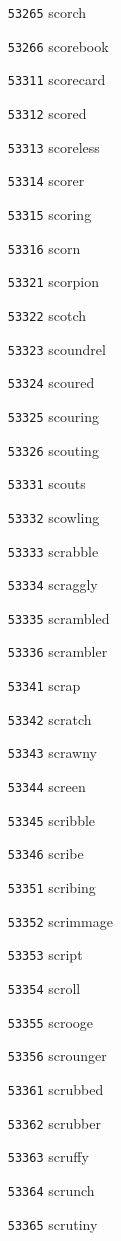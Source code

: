 \documentclass[twoside,11pt]{article}
\begin{document}
\begin{multicols}{5}
\begin{enumerate}
\item[\texttt{53265}] scorch
\item[\texttt{53266}] scorebook
\item[\texttt{53311}] scorecard
\item[\texttt{53312}] scored
\item[\texttt{53313}] scoreless
\item[\texttt{53314}] scorer
\item[\texttt{53315}] scoring
\item[\texttt{53316}] scorn
\item[\texttt{53321}] scorpion
\item[\texttt{53322}] scotch
\item[\texttt{53323}] scoundrel
\item[\texttt{53324}] scoured
\item[\texttt{53325}] scouring
\item[\texttt{53326}] scouting
\item[\texttt{53331}] scouts
\item[\texttt{53332}] scowling
\item[\texttt{53333}] scrabble
\item[\texttt{53334}] scraggly
\item[\texttt{53335}] scrambled
\item[\texttt{53336}] scrambler
\item[\texttt{53341}] scrap
\item[\texttt{53342}] scratch
\item[\texttt{53343}] scrawny
\item[\texttt{53344}] screen
\item[\texttt{53345}] scribble
\item[\texttt{53346}] scribe
\item[\texttt{53351}] scribing
\item[\texttt{53352}] scrimmage
\item[\texttt{53353}] script
\item[\texttt{53354}] scroll
\item[\texttt{53355}] scrooge
\item[\texttt{53356}] scrounger
\item[\texttt{53361}] scrubbed
\item[\texttt{53362}] scrubber
\item[\texttt{53363}] scruffy
\item[\texttt{53364}] scrunch
\item[\texttt{53365}] scrutiny

\end{enumerate}
\end{multicols}
\end{document}

